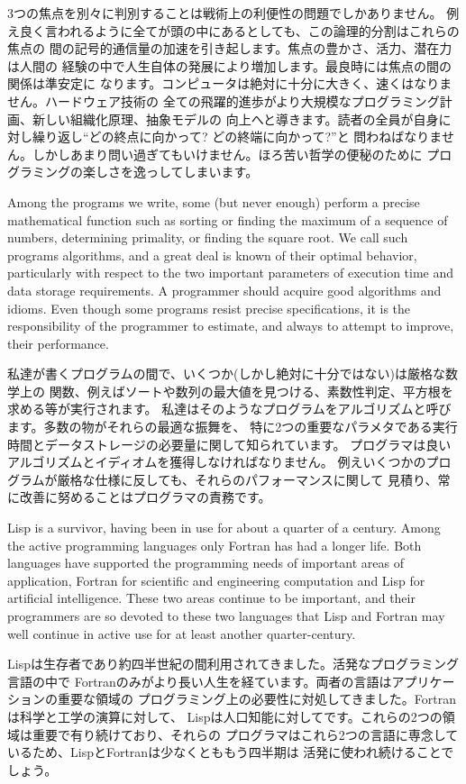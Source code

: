 \documentclass[oneside]{book}
\begin{document}
3つの焦点を別々に判別することは戦術上の利便性の問題でしかありません。
例え良く言われるように全てが頭の中にあるとしても、この論理的分割はこれらの焦点の
間の記号的通信量の加速を引き起します。焦点の豊かさ、活力、潜在力は人間の
経験の中で人生自体の発展により増加します。最良時には焦点の間の関係は準安定に
なります。コンピュータは絶対に十分に大きく、速くはなりません。ハードウェア技術の
全ての飛躍的進歩がより大規模なプログラミング計画、新しい組織化原理、抽象モデルの
向上へと導きます。読者の全員が自身に対し繰り返し``どの終点に向かって? どの終端に向かって?''と
問わねばなりません。しかしあまり問い過ぎてもいけません。ほろ苦い哲学の便秘のために
プログラミングの楽しさを逸っしてしまいます。

Among the programs we write, some (but never enough) perform a precise
mathematical function such as sorting or finding the maximum of a sequence of
numbers, determining primality, or finding the square root.  We call such
programs algorithms, and a great deal is known of their optimal behavior,
particularly with respect to the two important parameters of execution time and
data storage requirements.  A programmer should acquire good algorithms and
idioms.  Even though some programs resist precise specifications, it is the
responsibility of the programmer to estimate, and always to attempt to improve,
their performance.

私達が書くプログラムの間で、いくつか(しかし絶対に十分ではない)は厳格な数学上の
関数、例えばソートや数列の最大値を見つける、素数性判定、平方根を求める等が実行されます。
私達はそのようなプログラムをアルゴリズムと呼びます。多数の物がそれらの最適な振舞を、
特に2つの重要なパラメタである実行時間とデータストレージの必要量に関して知られています。
プログラマは良いアルゴリズムとイディオムを獲得しなければなりません。
例えいくつかのプログラムが厳格な仕様に反しても、それらのパフォーマンスに関して
見積り、常に改善に努めることはプログラマの責務です。

Lisp is a survivor, having been in use for about a quarter of a century.  Among
the active programming languages only Fortran has had a longer life.  Both
languages have supported the programming needs of important areas of
application, Fortran for scientific and engineering computation and Lisp for
artificial intelligence.  These two areas continue to be important, and their
programmers are so devoted to these two languages that Lisp and Fortran may
well continue in active use for at least another quarter-century.

Lispは生存者であり約四半世紀の間利用されてきました。活発なプログラミング言語の中で
Fortranのみがより長い人生を経ています。両者の言語はアプリケーションの重要な領域の
プログラミング上の必要性に対処してきました。Fortranは科学と工学の演算に対して、
Lispは人口知能に対してです。これらの2つの領域は重要で有り続けており、それらの
プログラマはこれら2つの言語に専念しているため、LispとFortranは少なくとももう四半期は
活発に使われ続けることでしょう。
\end{document}
